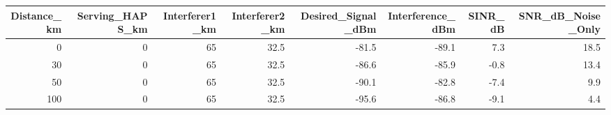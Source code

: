 \begin{tabular}{rrrrrrrr}
\toprule
Distance_km & Serving_HAPS_km & Interferer1_km & Interferer2_km & Desired_Signal_dBm & Interference_dBm & SINR_dB & SNR_dB_Noise_Only \\
\midrule
0 & 0 & 65 & 32.5 & -81.5 & -89.1 & 7.3 & 18.5 \\
30 & 0 & 65 & 32.5 & -86.6 & -85.9 & -0.8 & 13.4 \\
50 & 0 & 65 & 32.5 & -90.1 & -82.8 & -7.4 & 9.9 \\
100 & 0 & 65 & 32.5 & -95.6 & -86.8 & -9.1 & 4.4 \\
\bottomrule
\end{tabular}
